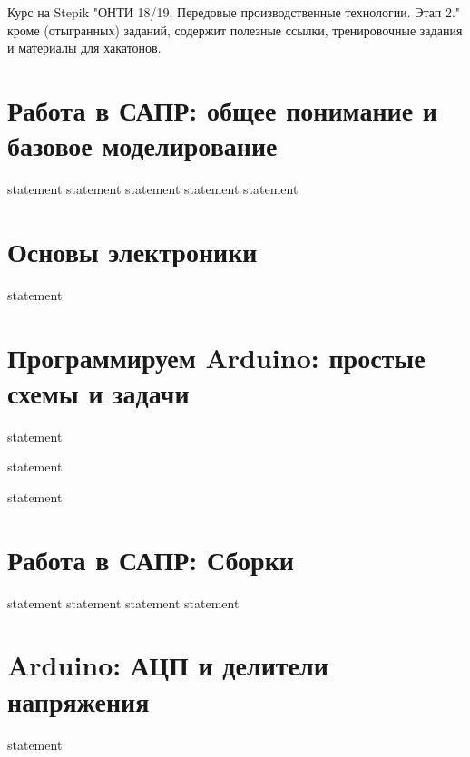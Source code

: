 Курс на Stepik "ОНТИ 18/19. Передовые производственные технологии. Этап 2." кроме (отыгранных) заданий, содержит полезные ссылки, тренировочные задания и материалы для хакатонов. 

\section{Работа в САПР: общее понимание и базовое моделирование}

{statement}
{statement}
{statement}
{statement}
{statement}

\section{Основы электроники}

{statement}

\section{Программируем Arduino: простые схемы и задачи}

{statement}

{statement}

{statement}

\section{Работа в САПР: Сборки}

{statement}
{statement}
{statement}
{statement}

\section{Arduino: АЦП и делители напряжения}

{statement}

